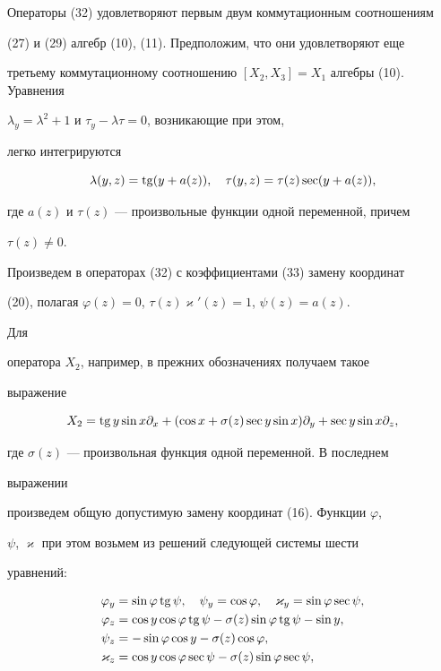  


Операторы (32) удовлетворяют первым двум коммутационным соотношениям 


(27) и (29) алгебр (10), (11). Предположим, что они удовлетворяют еще 


третьему коммутационному соотношению $[X_2,X_3]=X_1$ алгебры (10). Уравнения 


$\lambda_y=\lambda^2+1$ и $\tau_y-\lambda\tau=0$, возникающие при этом, 


легко интегрируются


\begin{equation} 


\lambda(y,z)=\tg(y+a(z)),\quad 


\tau(y,z)=\tau(z)\sec(y+a(z)), 


\end{equation} 


где $a(z)$ и $\tau(z)$ --- произвольные функции одной переменной, причем 


$\tau(z)\ne 0$. 


 


Произведем в операторах (32) с коэффициентами (33) замену координат 


(20), полагая $\varphi(z)=0$, $\tau(z)\varkappa'(z)=1$, $\psi(z)=a(z)$. 


Для 


оператора $X_2$, например, в прежних обозначениях получаем такое 


выражение 


$$ 


X_2=\tg y\sin x\partial_x+ 


(\cos x+\sigma(z)\sec y\sin x)\partial_y+ 


\sec y\sin x\partial_z, 


$$ 


где $\sigma(z)$ --- произвольная функция одной переменной. В последнем 


выражении 


произведем общую допустимую замену координат (16). Функции $\varphi$, 


$\psi$, $\varkappa$ при этом возьмем из решений следующей системы шести 


уравнений: 


\begin{align*} 


\varphi_y&=\sin\varphi\tg\psi,\quad 


\psi_y=\cos\varphi,\quad \varkappa_y=\sin\varphi\sec\psi,\\ 


\varphi_z&=\cos y\cos\varphi\tg\psi-\sigma(z)\sin\varphi\tg\psi- 


\sin y,\\ 


\psi_z&=-\sin\varphi\cos y-\sigma(z)\cos\varphi,\\ 


\varkappa_z&=\cos y\cos\varphi\sec\psi- 


\sigma(z)\sin\varphi\sec\psi, 


\end{align*} 


